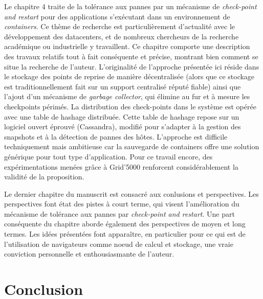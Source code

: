 \documentclass[a4paper,12pt]{article}
\begin{document}

Le  chapitre  4  traite  de  la   tolérance  aux  pannes  par  un  mécanisme  de
\emph{check-point  and  restart}  pour  des  applications  s'exécutant  dans  un
environnement de  \emph{containers}. Ce thème de  recherche est particulièrement
d'actualité avec le développement des  datacenters, et de nombreux chercheurs de
la recherche académique ou industrielle  y travaillent. Ce chapitre comporte une
description des  travaux relatifs tout  à fait conséquente et  précise, montrant
bien  comment se  situe la  recherche de  l'auteur. L'originalité  de l'approche
présentée  ici  réside  dans  le  stockage des  points  de  reprise  de  manière
décentralisée (alors que ce stockage  est traditionnellement fait sur un support
centralisé  réputé fiable)  ainsi que  l'ajout d'un  mécanisme de  \emph{garbage
  collector},  qui élimine  au  fur et  à mesure  les  checkpoints périmés.   La
distribution  des check-points  dans le  système est  opérée avec  une table  de
hashage  distribuée.  Cette  table  de  hashage repose  sur  un logiciel  ouvert
éprouvé (Cassandra), modifié  pour s'adapter à la gestion des  snapshots et à la
détection  de pannes  des  hôtes. L'approche  est  difficile techniquement  mais
ambitieuse car  la sauvegarde  de containers offre  une solution  générique pour
tout type  d'application.  Pour ce  travail encore, des  expérimentations menées
grâce à Grid'5000 renforcent considérablement la validité de la proposition.



Le dernier  chapitre du manuscrit  est consacré aux conlusions  et perspectives.
Les perspectives font  état des pistes à court terme,  qui visent l'amélioration
du mécanisme  de tolérance aux  pannes par \emph{check-point and  restart}.  Une
part conséquente du chapitre aborde également  des perspectives de moyen et long
termes. Les idées présentées font apparaître,  en particulier pour ce qui est de
l'utilisation  de navigateurs  comme  noeud  de calcul  et  stockage, une  vraie
conviction personnelle et enthousiasmante de l'auteur.



\section*{Conclusion}
\end{document}
